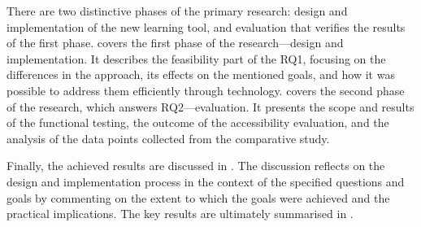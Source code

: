 There are two distinctive phases of the primary research: design and implementation of the new learning tool, and evaluation that verifies the results of the first phase.
 covers the first phase of the research---design and implementation.
It describes the feasibility part of the RQ1, focusing on the differences in the approach, its effects on the mentioned goals, and how it was possible to address them efficiently through technology.
 covers the second phase of the research, which answers RQ2---evaluation.
It presents the scope and results of the functional testing, the outcome of the accessibility evaluation, and the analysis of the data points collected from the comparative study.

Finally, the achieved results are discussed in .
The discussion reflects on the design and implementation process in the context of the specified questions and goals by commenting on the extent to which the goals were achieved and the practical implications.
The key results are ultimately summarised in .
